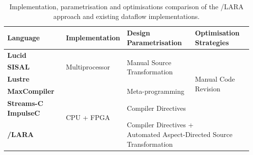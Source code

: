 \begin{table}[!ht]
  \renewcommand{\arraystretch}{1.2}
  \centering
  \begin{tabularx}{\textwidth}{ m{2.5cm} | X | X | p{2.5cm}}
    \hline
    \bf{Language}                  & \bf{Implementation}             & \bf{Design Parametrisation}                     & \bf{Optimisation Strategies}                                                                                                                                        \\
    \hline \hline
    \bf{Lucid}                     & \multirow{3}{*}{Multiprocessor} & \multirow{3}{3cm}{Manual Source Transformation} & \multirow{5}{3cm}{Manual Code Revision}                                                                                                                             \\
   \bf{SISAL}                      &                                 &                                                 &                                                                                                                                                                     \\
 \bf{Lustre}                      &                             &                              &                                                                            \\
    \bf{MaxCompiler}             & \multirow{6}{*}{CPU + FPGA} & Meta-programming             &                                                                            \\
\cline{1-1}\cline{2-3}
  \bf{Streams-C} \bf{ImpulseC}\ &                             & Compiler \newline Directives &                                                                            \\
\hline
  \bf{\FAST{}}/\bf{LARA}         &                             & \multicolumn{2}{p{7cm}}{Compiler Directives + \newline Automated Aspect-Directed Source Transformation} \\
  \end{tabularx}
  \caption{Implementation, parametrisation and optimisations comparison of the \FAST{}/LARA approach and existing dataflow implementations.}
  \label{table:feature-comparison2}
\end{table}
